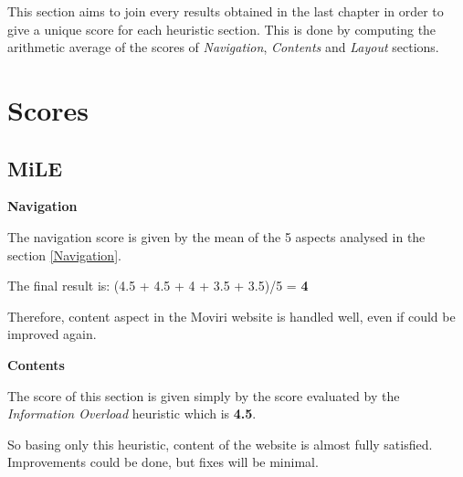 This section aims to join every results obtained in the last chapter in order to give a unique score for each heuristic section. This is done by computing the arithmetic average of the scores of \textit{Navigation}, \textit{Contents} and \textit{Layout} sections.\par
\bigskip
\section{Scores}
\subsection{MiLE}
\textbf{Navigation}\par
The navigation score is given by the mean of the 5 aspects analysed in the section \ref{Navigation}. \par 
The final result is: 
(4.5 + 4.5 + 4 + 3.5 + 3.5)/5 = \textbf{4}\par
Therefore, content aspect in the Moviri website is handled well, even if could be improved again.

\begin{figure}[H]
  \centering
\end{figure}

\par\medskip

\textbf{Contents}\par
The score of this section is given simply by the score evaluated by the \textit{Information Overload} heuristic which is \textbf{4.5}. \par
So basing only this heuristic, content of the website is almost fully satisfied. Improvements could be done, but fixes will be minimal.

\begin{figure}[H]
  \centering
\end{figure}


